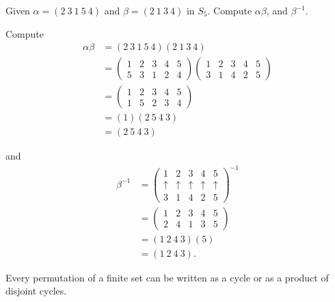 \begin{example}
    Given $\alpha = (2 \> 3 \> 1 \> 5 \> 4)$ and $\beta = (2 \> 1 \> 3 \>4)$ in $S_5$. Compute $\alpha \beta$, and $\beta^{-1}$.
\end{example}
\begin{solution}
    Compute 
    \begin{align*}
        \alpha \beta &= (2 \> 3 \> 1 \> 5 \> 4)(2 \> 1 \> 3 \>4)\\
        &= \begin{pmatrix}
            1 & 2 & 3 & 4 & 5\\
            5 & 3 & 1 & 2 & 4
        \end{pmatrix}
        \begin{pmatrix}
            1 & 2 & 3 & 4 & 5\\
            3 & 1 & 4 & 2 & 5
        \end{pmatrix}\\
        &= \begin{pmatrix}
            1 & 2 & 3 & 4 & 5\\
            1 & 5 & 2 & 3 & 4
        \end{pmatrix}\\
        &= (1)(2 \> 5 \> 4 \> 3)\\
        &= (2 \> 5 \> 4 \> 3)
    \end{align*}

    and 
    \begin{align*}
        \beta^{-1} &= \begin{pmatrix}
            1 & 2 & 3 & 4 & 5\\
            \uparrow & \uparrow  & \uparrow  & \uparrow  & \uparrow \\
            3 & 1 & 4 & 2 & 5
        \end{pmatrix}^{-1}\\
        &= \begin{pmatrix}
            1 & 2 & 3 & 4 & 5\\
            2 & 4 & 1 & 3 & 5
        \end{pmatrix}\\
        &= (1 \> 2 \> 4 \> 3)(5)\\
        &= (1 \> 2 \> 4 \> 3).
    \end{align*}
\end{solution}

\begin{lemma}
    Every permutation of a finite set can be written as a cycle or as a product of disjoint cycles.
\end{lemma}

